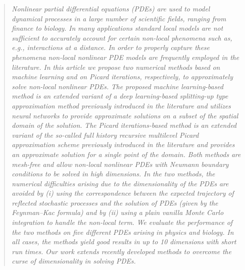 \begin{quote} %
  \small{\textit{
	Nonlinear partial differential equations (PDEs) are used to model dynamical processes in a large number of scientific fields, ranging from finance to biology. In many applications standard local models are not sufficient to accurately account for certain non-local phenomena such as, e.g., interactions at a distance. In order to properly capture these phenomena non-local nonlinear PDE models are frequently employed in the literature. In this article we propose two numerical methods based on machine learning and on Picard iterations, respectively, to approximately solve non-local nonlinear PDEs.
	The proposed machine learning-based method is an extended variant of a deep learning-based splitting-up type approximation method previously introduced in the literature and utilizes neural networks to provide approximate solutions on a subset of the spatial domain of the solution. 
	The Picard iterations-based method is an extended variant of the so-called \emph{full history recursive multilevel Picard} approximation scheme previously introduced in the literature and provides an approximate solution for a single point of the domain. Both methods are mesh-free and allow non-local nonlinear PDEs with Neumann boundary conditions to be solved in high dimensions.
	In the two methods, the numerical difficulties arising due to the dimensionality of the PDEs are avoided by (i) using the correspondence between the expected trajectory of reflected stochastic processes and the solution of PDEs (given by the Feynman--Kac formula) and by (ii) using a plain vanilla Monte Carlo integration to handle the non-local term. 
	We evaluate the performance of the two methods on five different PDEs arising in physics and biology.
	In all cases, the methods yield good results in up to 10 dimensions with short run times.
	Our work extends recently developed methods to overcome the curse of dimensionality in solving PDEs.
  }}
  \end{quote}
  
\newpage

